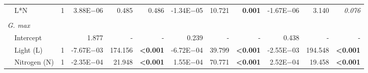 \begin{landscape}
\begin{table}
{\begin{tabular}{p{0.1cm}p{2.5cm}p{0.5cm}p{1.75cm}p{1.5cm}p{1.5cm}p{1.75cm}p{1.5cm}p{1.5cm}p{1.75cm}p{1.5cm}p{1.5cm}}
         & L*N
         & \multicolumn{1}{r}{1}            
         & \multicolumn{1}{r}{3.88E$-$06}     & \multicolumn{1}{r}{0.485}     & \multicolumn{1}{r}{0.486}
         & \multicolumn{1}{r}{-1.34E$-$05}    & \multicolumn{1}{r}{10.721}    & \multicolumn{1}{r}{\textbf{0.001}}
         & \multicolumn{1}{r}{-1.67E$-$06}    & \multicolumn{1}{r}{3.140}     & \multicolumn{1}{r}{\textit{0.076}}                 
         \\ 
         &&&&&&&&&& 
         \\ 
         
         \multicolumn{2}{l}{\textit{G. max}} &&&&&&&&&& 
         \\
         & Intercept
         && \multicolumn{1}{r}{1.877}       & \multicolumn{1}{r}{-}         & \multicolumn{1}{r}{-}                     
         & \multicolumn{1}{r}{0.239}        & \multicolumn{1}{r}{-}         & \multicolumn{1}{r}{-}  
         & \multicolumn{1}{r}{0.438}        & \multicolumn{1}{r}{-}         & \multicolumn{1}{r}{-} 
         \\
         
         & Light (L)
         & \multicolumn{1}{r}{1}
         & \multicolumn{1}{r}{-7.67E$-$03}    & \multicolumn{1}{r}{174.156}   & \multicolumn{1}{r}{\textbf{<0.001}}      
         & \multicolumn{1}{r}{-6.72E$-$04}    & \multicolumn{1}{r}{39.799}    & \multicolumn{1}{r}{\textbf{<0.001}}
         & \multicolumn{1}{r}{-2.55E$-$03}    & \multicolumn{1}{r}{194.548}   & \multicolumn{1}{r}{\textbf{<0.001}} 
         \\
         
         & Nitrogen (N)
         & \multicolumn{1}{r}{1} 
         & \multicolumn{1}{r}{-2.35E$-$04}    & \multicolumn{1}{r}{21.948}    & \multicolumn{1}{r}{\textbf{<0.001}}
         & \multicolumn{1}{r}{1.55E$-$04}     & \multicolumn{1}{r}{70.771}    & \multicolumn{1}{r}{\textbf{<0.001}}
         & \multicolumn{1}{r}{2.52E$-$04}     & \multicolumn{1}{r}{19.458}    & \multicolumn{1}{r}{\textbf{<0.001}} 
         \\
         

\end{tabular}}
\end{table}
\end{landscape}
